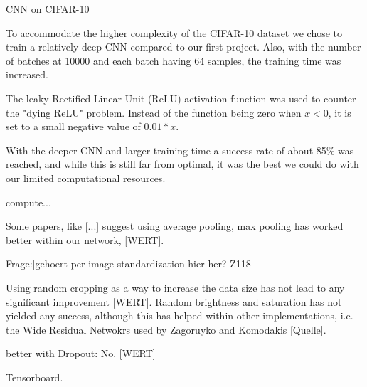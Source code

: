 \documentclass{article}
\begin{document}
\begin{enumerate}
	\begin{item}
		CNN on CIFAR-10
	\end{item}

	\begin{enumerate}
		\begin{item}
			To accommodate the higher complexity of the CIFAR-10 dataset we chose to train a relatively deep CNN compared to our first project.  
			Also, with the number of batches at 10000 and each batch having 64 samples, the training time was increased.
			
			The leaky Rectified Linear Unit (ReLU) activation function was used to counter the "dying ReLU" problem. Instead of the function being zero when $x < 0$, it is set to a small negative value of $ 0.01 * x $. 
		\end{item}
		
		\begin{item}
			With the deeper CNN and larger training time a success rate of about 85\% was reached, and while this is still far from optimal, it was the best we could do with our limited computational resources. 
		\end{item}
		
		\begin{item}
			compute...
		\end{item}
		
		\begin{item}
			Some papers, like [...] suggest using average pooling, max pooling has worked better within our network, [WERT].
		\end{item}
		
		\begin{item}
			Frage:[gehoert per image standardization hier her? Z118]
			
			Using random cropping as a way to increase the data size has not lead to any significant improvement [WERT]. 
			Random brightness and saturation has not yielded any success, although this has helped within other implementations, i.e. the Wide Residual Netwokrs used by Zagoruyko and  Komodakis [Quelle].
		\end{item}
		
		\begin{item}
			better with Dropout: No. [WERT]
		\end{item}
		
		\begin{item}
			Tensorboard.
		\end{item}
		

\end{enumerate}
\end{enumerate}
\end{document}
